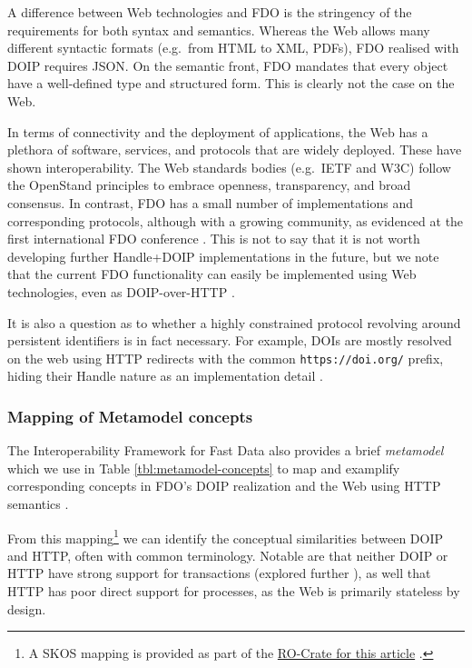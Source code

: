 \documentclass[fleqn,10pt,lineno]{wlpeerjlua}
\begin{document}
A difference between Web technologies and FDO is the stringency of the requirements for both syntax and semantics. Whereas the Web allows many different syntactic formats (e.g.~from HTML to XML, PDFs), FDO realised with DOIP requires JSON. On the semantic front, FDO mandates that every object have a well-defined type and structured form. This is clearly not the case on the Web.

In terms of connectivity and the deployment of applications, the Web has a plethora of software, services, and protocols that are widely deployed. These have shown interoperability. The Web standards bodies (e.g.~IETF and W3C) follow the OpenStand principles \autocite{ModernStandardsParadigm} to embrace openness, transparency, and broad consensus. In contrast, FDO has a small number of implementations and corresponding protocols, although with a growing community, as evidenced at the first international FDO conference \autocite{looFirstInternationalConference2022}. This is not to say that it is not worth developing further Handle+DOIP implementations in the future, but we note that the current FDO functionality can easily be implemented using Web technologies, even as DOIP-over-HTTP \autocite{DOIPAPIHTTPa}.

It is also a question as to whether a highly constrained protocol revolving around persistent identifiers is in fact necessary. For example, DOIs are mostly resolved on the web using HTTP redirects with the common \texttt{https://doi.org/} prefix, hiding their Handle nature as an implementation detail \autocite{DOIHandbookResolution}.



\subsubsection*{Mapping of Metamodel concepts}\label{mapping-of-metamodel-concepts}

The Interoperability Framework for Fast Data also provides a brief \emph{metamodel} which we use in Table \vref{tbl:metamodel-concepts} to map and examplify corresponding concepts in FDO's DOIP realization and the Web using HTTP semantics \autocite{rfc9110}. 

From this mapping\footnote{A SKOS mapping \autocite{w3-skos-primer} is provided as part of the \href{https://w3id.org/ro/doi/10.5281/zenodo.8075229}{RO-Crate for this article} \autocite{soilandreyes2023}.} we can identify the conceptual similarities between DOIP and HTTP, often with common terminology. Notable are that neither DOIP or HTTP have strong support for transactions (explored further ), as well that HTTP has poor direct support for processes, as the Web is primarily stateless by design.
\end{document}
